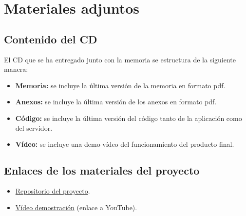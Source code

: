 \section{Materiales adjuntos}

\subsection{Contenido del CD}

El CD que se ha entregado junto con la memoria se estructura de la siguiente manera:

\begin{itemize}
\item
	\textbf{Memoria:} se incluye la última versión de la memoria en formato pdf.
\item
	\textbf{Anexos:} se incluye la última versión de los anexos en formato pdf.
\item
	\textbf{Código:} se incluye la última versión del código tanto de la aplicación como del servidor.
\item
	\textbf{Vídeo:} se incluye una demo vídeo del funcionamiento del producto final.
\end{itemize}

\subsection{Enlaces de los materiales del proyecto}

\begin{itemize}
\item
	\href{https://github.com/fmv1001/DomoCamera}{Repositorio del proyecto}.
\item
	\href{https://youtu.be/txAF8uAJ6B0}{Vídeo demostración} (enlace a YouTube).
\end{itemize}